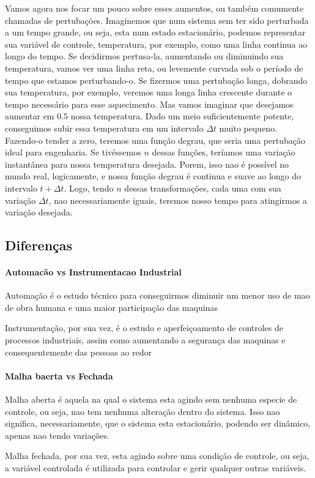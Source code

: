 Vamos agora nos focar um pouco sobre esses aumentos, ou também comumente chamadas de pertubações.
Imaginemos que num sistema sem ter sido perturbada a um tempo grande, ou seja, esta num estado
estacionário, podemos representar sua variável de controle, temperatura, por exemplo, como uma linha
continua ao longo do tempo. Se decidirmos pertusa-la, aumentando ou diminuindo sua temperatura,
vamos ver uma linha reta, ou levemente curvada sob o período de tempo que estamos perturbando-o. Se
fizermos uma pertubação longa, dobrando sua temperatura, por exemplo, veremos uma longa linha
crescente durante o tempo necessário para esse aquecimento. Mas vamos imaginar que desejamos
aumentar em \(0.5\) nossa temperatura. Dado um meio suficientemente potente, conseguimos subir essa
temperatura em um intervalo \(\Delta t\) muito pequeno. Fazendo-o tender a zero, teremos uma função
degrau, que seria uma pertubação ideal para engenharia. Se tivéssemos \(n\) dessas funções, teríamos
uma variação instantânea para nossa temperatura desejada. Porem, isso nao é possível no mundo real,
logicamente, e nossa função degrau é continua e suave ao longo do intervalo \(t+ \Delta t\). Logo,
tendo \(n\) dessas transformações, cada uma com sua variação \(\Delta t\), nao necessariamente
iguais, teremos nosso tempo para atingirmos a variação desejada. \par

\subsection{Diferenças}
\paragraph{Automacão vs Instrumentacao Industrial}
Automação é o estudo técnico para conseguirmos diminuir um menor uso de mao de obra humana e uma
maior participação das maquinas \par

Instrumentação, por sua vez, é o estudo e aperfeiçoamento de controles de processos industriais,
assim como aumentando a segurança das maquinas e consequentemente das pessoas ao redor
\par

\paragraph{Malha baerta vs Fechada}
Malha aberta é aquela na qual o sistema esta agindo sem nenhuma especie de controle, ou seja, nao
tem nenhuma alteração dentro do sistema. Isso nao significa, necessariamente, que o sistema esta
estacionário, podendo ser dinâmico, apenas nao tendo variações.\par

Malha fechada, por sua vez, esta agindo sobre uma condição de controle, ou seja, a variável
controlada é utilizada para controlar e gerir qualquer outras variáveis.